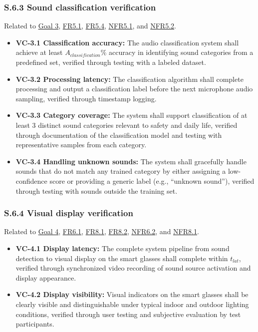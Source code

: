 \documentclass[12pt]{article}
\theoremstyle{definition}
\begin{document}
\subsubsection{S.6.3 Sound classification verification}

Related to \hyperref[goal:audio_identification_analysis]{Goal 3},
\hyperref[FR5_1]{FR5.1}, \hyperref[FR5_4]{FR5.4}, \hyperref[NFR5_1]{NFR5.1}, and
\hyperref[NFR5_2]{NFR5.2}.

\begin{itemize}
\item \textbf{VC-3.1 Classification accuracy:} The audio classification system
shall achieve at least \hyperref[symbol:A_classfication]{$A_{classification}\%$} 
accuracy in identifying sound categories from a predefined set, verified through
testing with a labeled dataset.

\item \textbf{VC-3.2 Processing latency:}\label{sec:VC-3.2} The classification 
algorithm shall complete processing and output a classification label before
the next microphone audio sampling, verified through timestamp logging.

\item \textbf{VC-3.3 Category coverage:} The system shall support classification
of at least 3 distinct sound categories relevant to safety and daily life,
verified through documentation of the classification model and testing with
representative samples from each category.

\item \textbf{VC-3.4 Handling unknown sounds:} The system shall gracefully
handle sounds that do not match any trained category by either assigning a
low-confidence score or providing a generic label (e.g., ``unknown sound''),
verified through testing with sounds outside the training set.
\end{itemize}

\subsubsection{S.6.4 Visual display verification}

Related to \hyperref[goal:visual_display]{Goal 4}, \hyperref[FR6_1]{FR6.1},
\hyperref[FR8_1]{FR8.1}, \hyperref[FR8_2]{FR8.2}, \hyperref[NFR6_2]{NFR6.2}, and
\hyperref[NFR8_1]{NFR8.1}.

\begin{itemize}
\item \textbf{VC-4.1 Display latency:}\label{sec:VC-4.1}
The complete system pipeline from sound
detection to visual display on the smart glasses shall complete within 
\hyperref[symbol:t_lat]{$t_{lat}$}, verified through synchronized
video recording of sound source activation and display appearance.

\item \textbf{VC-4.2 Display visibility:} Visual indicators on the smart glasses
shall be clearly visible and distinguishable under typical indoor and outdoor
lighting conditions, verified through user testing and subjective evaluation by
test participants.
\end{itemize}
\end{document}
